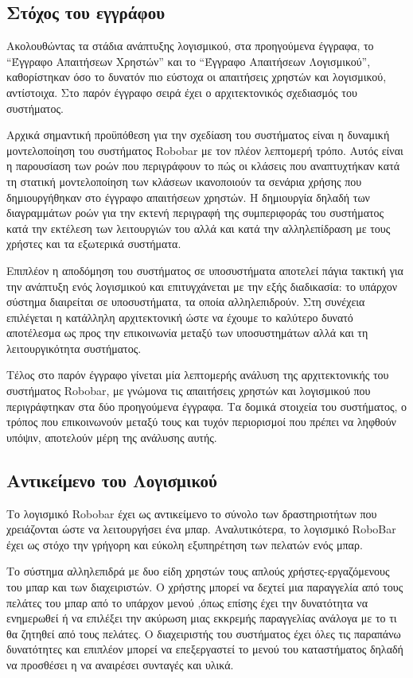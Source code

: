 \subsection{Στόχος του εγγράφου}

Ακολουθώντας τα στάδια ανάπτυξης λογισμικού, στα προηγούμενα έγγραφα,
το “Έγγραφο Απαιτήσεων Χρηστών” και το “Έγγραφο Απαιτήσεων
Λογισμικού”, καθορίστηκαν όσο το δυνατόν πιο εύστοχα οι απαιτήσεις
χρηστών και λογισμικού, αντίστοιχα. Στο παρόν έγγραφο σειρά έχει ο
αρχιτεκτονικός σχεδιασμός του συστήματος.

Αρχικά σημαντική προϋπόθεση για την σχεδίαση του συστήματος είναι η
δυναμική μοντελοποίηση του συστήματος Robobar με τον πλέον λεπτομερή
τρόπο. Αυτός είναι η παρουσίαση των ροών που περιγράφουν το πώς οι
κλάσεις που αναπτυχτήκαν κατά τη στατική μοντελοποίηση των κλάσεων
ικανοποιούν τα σενάρια χρήσης που δημιουργήθηκαν στο έγγραφο
απαιτήσεων χρηστών. Η δημιουργία δηλαδή των διαγραμμάτων ροών για την
εκτενή περιγραφή της συμπεριφοράς του συστήματος κατά την εκτέλεση των
λειτουργιών του αλλά και κατά την αλληλεπίδραση με τους χρήστες και τα
εξωτερικά συστήματα.

Επιπλέον η αποδόμηση του συστήματος σε υποσυστήματα αποτελεί πάγια
τακτική για την ανάπτυξη ενός λογισμικού και επιτυγχάνεται με την εξής
διαδικασία: το υπάρχον σύστημα διαιρείται σε υποσυστήματα, τα οποία
αλληλεπιδρούν. Στη συνέχεια επιλέγεται η κατάλληλη αρχιτεκτονική ώστε
να έχουμε το καλύτερο δυνατό αποτέλεσμα ως προς την επικοινωνία μεταξύ
των υποσυστημάτων αλλά και τη λειτουργικότητα συστήματος.

Τέλος στο παρόν έγγραφο γίνεται μία λεπτομερής ανάλυση της
αρχιτεκτονικής του συστήματος Robobar, με γνώμονα τις απαιτήσεις
χρηστών και λογισμικού που περιγράφτηκαν στα δύο προηγούμενα
έγγραφα. Τα δομικά στοιχεία του συστήματος, ο τρόπος που επικοινωνούν
μεταξύ τους και τυχόν περιορισμοί που πρέπει να ληφθούν υπόψιν,
αποτελούν μέρη της ανάλυσης αυτής.


\subsection{Αντικείμενο του Λογισμικού}

Το λογισμικό Robobar έχει ως αντικείμενο το σύνολο των δραστηριοτήτων
που χρειάζονται ώστε να λειτουργήσει ένα μπαρ. Αναλυτικότερα, το
λογισμικό RoboBar έχει ως στόχο την γρήγορη και εύκολη εξυπηρέτηση των
πελατών ενός μπαρ.

Το σύστημα αλληλεπιδρά με δυο είδη χρηστών τους απλούς
χρήστες-εργαζόμενους του μπαρ και των διαχειριστών. Ο χρήστης μπορεί
να δεχτεί μια παραγγελία από τους πελάτες του μπαρ από το υπάρχον
μενού ,όπως επίσης έχει την δυνατότητα να ενημερωθεί ή να επιλέξει την
ακύρωση μιας εκκρεμής παραγγελίας ανάλογα με το τι θα ζητηθεί από τους
πελάτες. Ο διαχειριστής του συστήματος έχει όλες τις παραπάνω
δυνατότητες και επιπλέον μπορεί να επεξεργαστεί το μενού του
καταστήματος δηλαδή να προσθέσει η να αναιρέσει συνταγές και υλικά.

